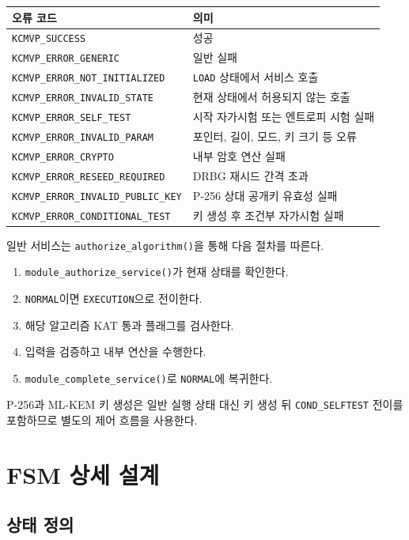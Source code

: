 \documentclass[11pt,a4paper]{article}
\begin{document}
\begin{longtable}{p{}p{}}
\toprule
오류 코드 & 의미 \\
\midrule
\endhead
\texttt{KCMVP\_SUCCESS} & 성공 \\
\texttt{KCMVP\_ERROR\_GENERIC} & 일반 실패 \\
\texttt{KCMVP\_ERROR\_NOT\_INITIALIZED} & \texttt{LOAD} 상태에서 서비스 호출 \\
\texttt{KCMVP\_ERROR\_INVALID\_STATE} & 현재 상태에서 허용되지 않는 호출 \\
\texttt{KCMVP\_ERROR\_SELF\_TEST} & 시작 자가시험 또는 엔트로피 시험 실패 \\
\texttt{KCMVP\_ERROR\_INVALID\_PARAM} & 포인터, 길이, 모드, 키 크기 등 오류 \\
\texttt{KCMVP\_ERROR\_CRYPTO} & 내부 암호 연산 실패 \\
\texttt{KCMVP\_ERROR\_RESEED\_REQUIRED} & DRBG 재시드 간격 초과 \\
\texttt{KCMVP\_ERROR\_INVALID\_PUBLIC\_KEY} & P-256 상대 공개키 유효성 실패 \\
\texttt{KCMVP\_ERROR\_CONDITIONAL\_TEST} & 키 생성 후 조건부 자가시험 실패 \\
\bottomrule
\end{longtable}

일반 서비스는 \texttt{authorize\_algorithm()}을 통해 다음 절차를 따른다.

\begin{enumerate}
  \item \texttt{module\_authorize\_service()}가 현재 상태를 확인한다.
  \item \texttt{NORMAL}이면 \texttt{EXECUTION}으로 전이한다.
  \item 해당 알고리즘 KAT 통과 플래그를 검사한다.
  \item 입력을 검증하고 내부 연산을 수행한다.
  \item \texttt{module\_complete\_service()}로 \texttt{NORMAL}에 복귀한다.
\end{enumerate}

P-256과 ML-KEM 키 생성은 일반 실행 상태 대신 키 생성 뒤
\texttt{COND\_SELFTEST} 전이를 포함하므로 별도의 제어 흐름을 사용한다.

\section{FSM 상세 설계}

\subsection{상태 정의}
\end{document}

